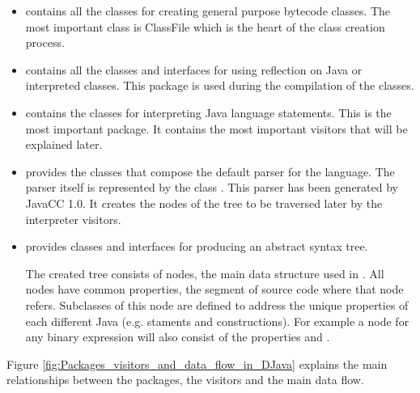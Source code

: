 \begin{itemize}
\item {} contains all the classes for creating general purpose bytecode
classes. The most important class is ClassFile which is the heart
of the class creation process.

\item {} contains all the classes and interfaces for using reflection
on Java or interpreted classes. This package is used during
the compilation of the classes.

\item {} contains the classes for interpreting Java language statements.
This is the most important package. It contains the most important
visitors that will be explained later.

\item {} provides the classes that compose the default parser for the
language. The parser itself is represented by the class .
This parser has been generated by JavaCC 1.0. It creates the nodes of the
tree to be traversed later by the interpreter visitors.

\item {} provides classes and interfaces for producing an abstract syntax
tree.

The created tree consists of nodes, the main data structure used
in \djava{}. All nodes have common properties, the segment
of source code where that node refers. Subclasses of this node
are defined to address the unique properties of each different
Java (e.g. staments and constructions). For example a node for
any binary expression will also consist of the properties 
and .

\end{itemize}

Figure \ref{fig:Packages_visitors_and_data_flow_in_DJava} explains the
main relationships between the packages, the visitors and the main data flow.

